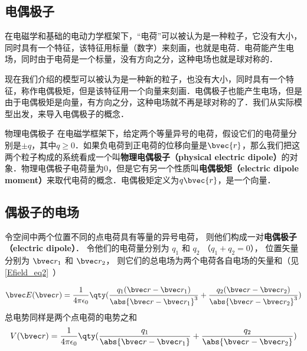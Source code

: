 


\subsection{电偶极子}

在电磁学和基础的电动力学框架下，“电荷”可以被认为是一种粒子，它没有大小，同时具有一个特征，该特征用标量（数字）来刻画，也就是电荷．电荷能产生电场，同时由于电荷是一个标量，没有方向之分，这种电场也就是球对称的．

现在我们介绍的模型可以被认为是一种新的粒子，也没有大小，同时具有一个特征，称作电偶极矩，但是该特征用一个向量来刻画．电偶极子也能产生电场，但是由于电偶极矩是向量，有方向之分，这种电场就不再是球对称的了．我们从实际模型出发，来导入电偶极子的概念．

\begin{definition}{物理电偶极子}
在电磁学框架下，给定两个等量异号的电荷，假设它们的电荷量分别是$\pm q$，其中$q\geq 0$．如果负电荷到正电荷的位移向量是$\bvec{r}$，那么我们把这两个粒子构成的系统看成一个叫\textbf{物理电偶极子（physical electric dipole）}的对象．物理电偶极子电荷量为$0$，但是它有另一个性质叫\textbf{电偶极矩（electric dipole moment）}来取代电荷的概念．电偶极矩定义为$q\bvec{r}$，是一个向量．
\end{definition}


\subsection{偶极子的电场}

令空间中两个位置不同的点电荷具有等量的异号电荷， 则他们构成一对\textbf{电偶极子（electric dipole）}． 令他们的电荷量分别为 $q_1$ 和 $q_2$ （$q_1 + q_2 = 0$）， 位置矢量分别为 $\bvec r_1$ 和 $\bvec r_2$， 则它们的总电场为两个电荷各自电场的矢量和（见\autoref{Efield_eq2}~）

\begin{equation}
\bvec E(\bvec r) = \frac{1}{4\pi\epsilon_0} \qty(\frac{q_1(\bvec r - \bvec r_1)}{\abs{\bvec r - \bvec r_1}^3} + \frac{q_2(\bvec r - \bvec r_2)}{\abs{\bvec r - \bvec r_2}^3})
\end{equation}
总电势同样是两个点电荷的电势之和%
\begin{equation}
V(\bvec r) = \frac{1}{4\pi\epsilon_0} \qty(\frac{q_1}{\abs{\bvec r - \bvec r_1}} + \frac{q_2}{\abs{\bvec r - \bvec r_2}})
\end{equation}

